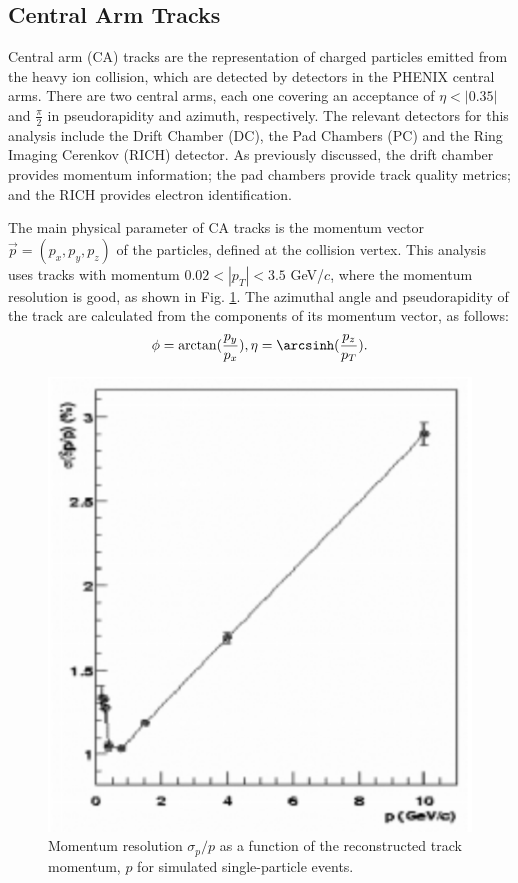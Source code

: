 \subsection{Central Arm Tracks}
Central arm (CA) tracks are the representation of charged particles emitted from the heavy ion collision, which are detected by detectors in the PHENIX central arms. There are two central arms, each one covering an acceptance of $\eta < |0.35|$ and $\frac{\pi}{2}$ in pseudorapidity and azimuth, respectively. The relevant detectors for this analysis include the Drift Chamber (DC), the Pad Chambers (PC) and the Ring Imaging Cerenkov (RICH) detector. As previously discussed, the drift chamber provides momentum information; the pad chambers provide track quality metrics; and the RICH provides electron identification. 

The main physical parameter of CA tracks is the momentum vector $\vec{p} = (p_x, p_y, p_z)$ of the particles, defined at the collision vertex. This analysis uses tracks with momentum $0.02 < |p_T| < 3.5$ GeV/$c$, where the momentum resolution is good, as shown in Fig. \ref{fig:dc_mom_res}. The azimuthal angle and pseudorapidity of the track are calculated from the components of its momentum vector, as follows: 
\begin{align}
\phi = \arctan( \frac{p_y}{p_x} ),
\eta = \arcsinh(\frac{p_z}{p_T}).
\label{eqn:phi_eta_form}
\end{align}

\begin{figure}[!h]
\begin{center}
\includegraphics[width=0.45\linewidth]{figs/dc_mom_res.png}
\caption{Momentum resolution $\sigma_{p}/p$ as a function of the reconstructed track momentum, $p$ for simulated single-particle events\cite{CA_spectro}.}
\label{fig:dc_mom_res}
\end{center}
\end{figure}

